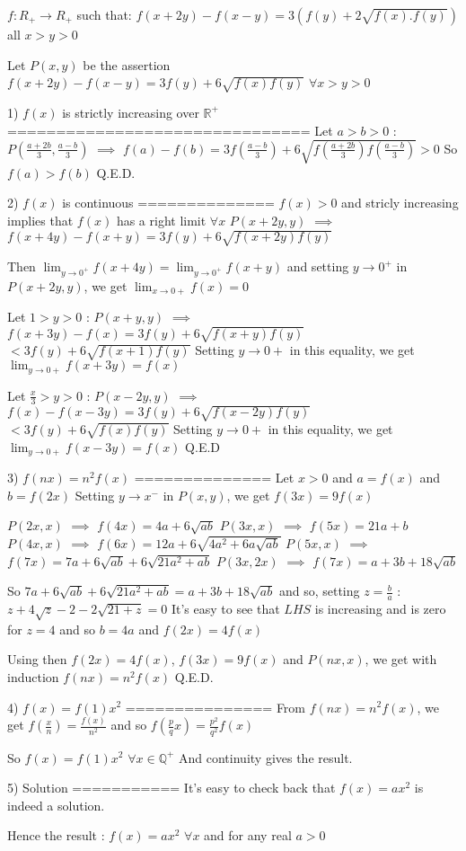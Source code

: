 \begin{solution}
	\begin{tcolorbox}$f: R_{+} \to R_{+}$ such that:
$f(x+2y)-f(x-y)=3(f(y)+2\sqrt{f(x).f(y)})$ all $x>y>0$\end{tcolorbox}
Let $P(x,y)$ be the assertion $f(x+2y)-f(x-y)=3f(y)+6\sqrt{f(x)f(y)}$ $\forall x>y>0$

1) $f(x)$ is strictly increasing over $\mathbb R^+$
===============================
Let $a>b>0$ : $P(\frac{a+2b}3,\frac{a-b}3)$ $\implies$ $f(a)-f(b)=3f(\frac{a-b}3)+6\sqrt{f(\frac{a+2b}3)f(\frac{a-b}3)}>0$
So $f(a)>f(b)$
Q.E.D.

2) $f(x)$ is continuous
==============
$f(x)>0$ and stricly increasing implies that $f(x)$ has a right limit $\forall x$
$P(x+2y,y)$ $\implies$ $f(x+4y)-f(x+y)=3f(y)+6\sqrt{f(x+2y)f(y)}$

Then $\lim_{y\to 0^+}f(x+4y)=\lim_{y\to 0^+}f(x+y)$ and setting $y\to 0^+$ in $P(x+2y,y)$, we get $\lim_{x\to 0+}f(x)=0$

Let $1>y>0$ : $P(x+y,y)$ $\implies$ $f(x+3y)-f(x)=3f(y)+6\sqrt{f(x+y)f(y)}$ $<3f(y)+6\sqrt{f(x+1)f(y)}$
Setting $y\to 0+$ in this equality, we get $\lim_{y\to 0+}f(x+3y)=f(x)$

Let $\frac x3>y>0$ : $P(x-2y,y)$ $\implies$ $f(x)-f(x-3y)=3f(y)+6\sqrt{f(x-2y)f(y)}$ $<3f(y)+6\sqrt{f(x)f(y)}$
Setting $y\to 0+$ in this equality, we get $\lim_{y\to 0+}f(x-3y)=f(x)$
Q.E.D

3) $f(nx)=n^2f(x)$
==============
Let $x>0$ and $a=f(x)$ and $b=f(2x)$
Setting $y\to x^-$ in $P(x,y)$, we get $f(3x)=9f(x)$

$P(2x,x)$ $\implies$ $f(4x)=4a+6\sqrt{ab}$
$P(3x,x)$ $\implies$ $f(5x)=21a+b$
$P(4x,x)$ $\implies$ $f(6x)=12a+6\sqrt{4a^2+6a\sqrt{ab}}$
$P(5x,x)$ $\implies$ $f(7x)=7a+6\sqrt{ab}+6\sqrt{21a^2+ab}$
$P(3x,2x)$ $\implies$ $f(7x)=a+3b+18\sqrt{ab}$

So $7a+6\sqrt{ab}+6\sqrt{21a^2+ab}=a+3b+18\sqrt{ab}$
and so, setting $z=\frac ba$ : $z+4\sqrt{z}-2-2\sqrt{21+z}=0$
It's easy to see that $LHS$ is increasing and is zero for $z=4$ and so $b=4a$ and $f(2x)=4f(x)$

Using then $f(2x)=4f(x)$, $f(3x)=9f(x)$ and $P(nx,x)$, we get with induction $f(nx)=n^2f(x)$
Q.E.D.

4) $f(x)=f(1)x^2$
===============
From $f(nx)=n^2f(x)$, we get $f(\frac xn)=\frac {f(x)}{n^2}$ and so $f(\frac pqx)=\frac {p^2}{q^2}f(x)$

So $f(x)=f(1)x^2$ $\forall x\in\mathbb Q^+$
And continuity gives the result.

5) Solution
===========
It's easy to check back that $f(x)=ax^2$ is indeed a solution.

Hence the result : $\boxed{f(x)=ax^2}$ $\forall x$ and for any real $a>0$
\end{solution}



